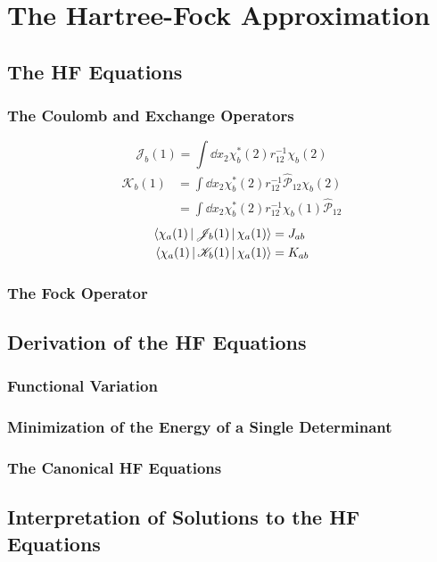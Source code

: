 \documentclass[a4paper]{article}
\newcommand{\hsP}{\hat{\mathscr{P}}}
\numberwithin{equation}{section}
\begin{document}
\section{The Hartree-Fock Approximation}
\subsection{The HF Equations}
\subsubsection{The Coulomb and Exchange Operators}
\begin{equation}\label{key}
\mathscr{J}_b(1) = \int\dd x_2 \chi_b^*(2)r_{12}^{-1} \chi_b(2)
\end{equation}
\begin{align}\label{key}
\mathscr{K}_b(1) &= \int\dd x_2 \chi_b^*(2) r_{12}^{-1} \hsP_{12} \chi_b(2) \\
&= \int\dd x_2 \chi_b^*(2) r_{12}^{-1} \chi_b(1) \hsP_{12} 
\end{align}
\begin{align}
\Braket{\chi_a(1) | \mathscr{J}_b(1) | \chi_a(1)} &= J_{ab} \\
\Braket{\chi_a(1) | \mathscr{K}_b(1) | \chi_a(1)} &= K_{ab} 
\end{align}
\subsubsection{The Fock Operator}
\subsection{Derivation of the HF Equations}
\subsubsection{Functional Variation}
\subsubsection{Minimization of the Energy of a Single Determinant}
\subsubsection{The Canonical HF Equations}

\subsection{Interpretation of Solutions to the HF Equations}
\end{document}

